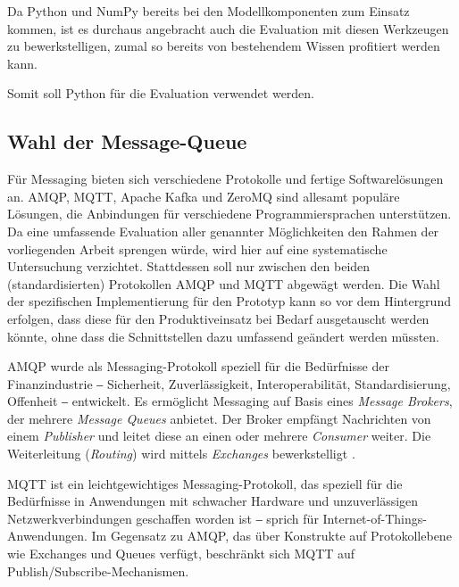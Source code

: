 Da Python und NumPy bereits bei den Modellkomponenten zum Einsatz kommen, ist es durchaus angebracht auch die Evaluation mit diesen Werkzeugen zu bewerkstelligen, zumal so bereits von bestehendem Wissen profitiert werden kann.

Somit soll Python für die Evaluation verwendet werden.

\subsection{Wahl der Message-Queue}
\label{sec:wahl-der-message-queue}

Für Messaging bieten sich verschiedene Protokolle und fertige Softwarelösungen an. AMQP, MQTT, Apache Kafka und ZeroMQ sind allesamt populäre Lösungen, die Anbindungen für verschiedene Programmiersprachen unterstützen. Da eine umfassende Evaluation aller genannter Möglichkeiten den Rahmen der vorliegenden Arbeit sprengen würde, wird hier auf eine systematische Untersuchung verzichtet. Stattdessen soll nur zwischen den beiden (standardisierten) Protokollen AMQP und MQTT abgewägt werden. Die Wahl der spezifischen Implementierung für den Prototyp kann so vor dem Hintergrund erfolgen, dass diese für den Produktiveinsatz bei Bedarf ausgetauscht werden könnte, ohne dass die Schnittstellen dazu umfassend geändert werden müssten.

AMQP wurde als Messaging-Protokoll speziell für die Bedürfnisse der Finanzindustrie ‒ Sicherheit, Zuverlässigkeit, Interoperabilität, Standardisierung, Offenheit \cite{amqp.org} ‒ entwickelt. Es ermöglicht Messaging auf Basis eines \textit{Message Brokers}, der mehrere \textit{Message Queues} anbietet. Der Broker empfängt Nachrichten von einem \textit{Publisher} und leitet diese an einen oder mehrere \textit{Consumer} weiter. Die Weiterleitung (\textit{Routing}) wird mittels \textit{Exchanges} bewerkstelligt \cite{amqp-model-explained}.

MQTT ist ein leichtgewichtiges Messaging-Protokoll, das speziell für die Bedürfnisse in Anwendungen mit schwacher Hardware und unzuverlässigen Netzwerkverbindungen geschaffen worden ist ‒ sprich für Internet-of-Things-Anwendungen. Im Gegensatz zu AMQP, das über Konstrukte auf Protokollebene wie Exchanges und Queues verfügt, beschränkt sich MQTT auf Publish/Subscribe-Mechanismen. \cite[S. 178]{rabbitmq}


